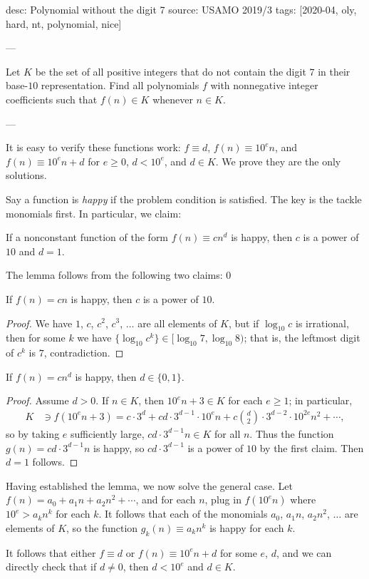 desc: Polynomial without the digit 7
source: USAMO 2019/3
tags: [2020-04, oly, hard, nt, polynomial, nice]

---

Let $K$ be the set of all positive integers that do not contain the digit $7$ in their base-$10$ representation. Find all polynomials $f$ with nonnegative integer coefficients such that $f(n)\in K$ whenever $n\in K$.

---

It is easy to verify these functions work: $f\equiv d$, $f(n)\equiv10^en$, and $f(n)\equiv10^en+d$ for $e\ge0$, $d<10^e$, and $d\in K$. We prove they are the only solutions.

Say a function is \emph{happy} if the problem condition is satisfied. The key is the tackle monomials first. In particular, we claim:
\begin{lemma*}
    If a nonconstant function of the form $f(n)\equiv cn^d$ is happy, then $c$ is a power of $10$ and $d=1$.
\end{lemma*}
The lemma follows from the following two claims:
\setcounter{claim}0
\begin{claim}
    If $f(n)=cn$ is happy, then $c$ is a power of $10$.
\end{claim}
\begin{proof}
    We have $1$, $c$, $c^2$, $c^3$, $\ldots$ are all elements of $K$, but if $\log_{10}c$ is irrational, then for some $k$ we have $\{\log_{10}c^k\}\in[\log_{10}7,\log_{10}8)$; that is, the leftmost digit of $c^k$ is $7$, contradiction.
\end{proof}
\begin{claim}
    If $f(n)=cn^d$ is happy, then $d\in\{0,1\}$.
\end{claim}
\begin{proof}
    Assume $d>0$. If $n\in K$, then $10^en+3\in K$ for each $e\ge1$; in particular,
    \begin{align*}
        K&\ni f(10^en+3)=c\cdot3^d+cd\cdot3^{d-1}\cdot10^en+c\binom d2\cdot3^{d-2}\cdot10^{2e}n^2+\cdots,
    \end{align*}
    so by taking $e$ sufficiently large, $cd\cdot3^{d-1}n\in K$ for all $n$. Thus the function $g(n)=cd\cdot3^{d-1}n$ is happy, so $cd\cdot3^{d-1}$ is a power of $10$ by the first claim. Then $d=1$ follows.
\end{proof}

Having established the lemma, we now solve the general case. Let $f(n)=a_0+a_1n+a_2n^2+\cdots$, and for each $n$, plug in $f(10^en)$ where $10^e>a_kn^k$ for each $k$. It follows that each of the monomials $a_0$, $a_1n$, $a_2n^2$, $\ldots$ are elements of $K$, so the function $g_k(n)\equiv a_kn^k$ is happy for each $k$.

It follows that either $f\equiv d$ or $f(n)\equiv10^en+d$ for some $e$, $d$, and we can directly check that if $d\ne0$, then $d<10^e$ and $d\in K$.
